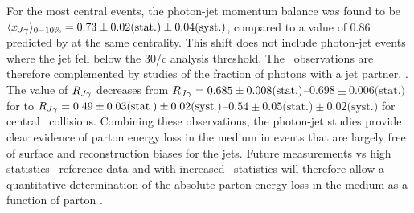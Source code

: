 For the most central events, the  photon-jet momentum balance  was found to be
$\langle x_{J\gamma}\rangle_{0-10\%} = 0.73 \pm 0.02 \mbox{(stat.)} \pm 0.04 \mbox{(syst.)}$, compared
to a value of 0.86 predicted by \PYTHYD{} at the same centrality. This shift does
not include photon-jet events where the jet fell below the 30\GeV/c analysis threshold. 
The \xjg\ observations are therefore complemented by studies of the fraction of 
photons with a jet partner, \rjg.  The value of $R_{J\gamma}$ decreases
from $R_{J\gamma} = 0.685\pm 0.008\mbox{(stat.)}$--$0.698\pm 0.006\mbox{(stat.)}$ for \PYTHYD{}
to  $R_{J\gamma} = 0.49\pm 0.03\mbox{(stat.)}\pm 0.02\mbox{(syst.)}$--$0.54\pm 0.05\mbox{(stat.)}\pm 0.02\mbox{(syst.)}$ for
central \PbPb\ collisions. Combining these observations, the photon-jet studies 
provide clear evidence of parton energy loss in the medium in events that are 
largely free of surface and reconstruction biases for the jets. Future measurements 
vs high statistics \pp\ reference data and with increased \PbPb\ statistics will
therefore allow a quantitative determination of the absolute parton energy loss
in the medium as a function of parton \pT.

